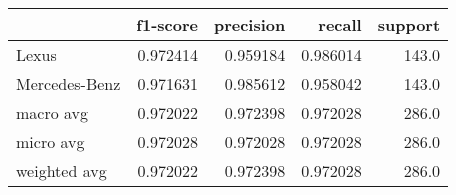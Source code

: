 \begin{tabular}{lrrrr}
\toprule
{} &  f1-score &  precision &    recall &  support \\
\midrule
Lexus         &  0.972414 &   0.959184 &  0.986014 &    143.0 \\
Mercedes-Benz &  0.971631 &   0.985612 &  0.958042 &    143.0 \\
macro avg     &  0.972022 &   0.972398 &  0.972028 &    286.0 \\
micro avg     &  0.972028 &   0.972028 &  0.972028 &    286.0 \\
weighted avg  &  0.972022 &   0.972398 &  0.972028 &    286.0 \\
\bottomrule
\end{tabular}

